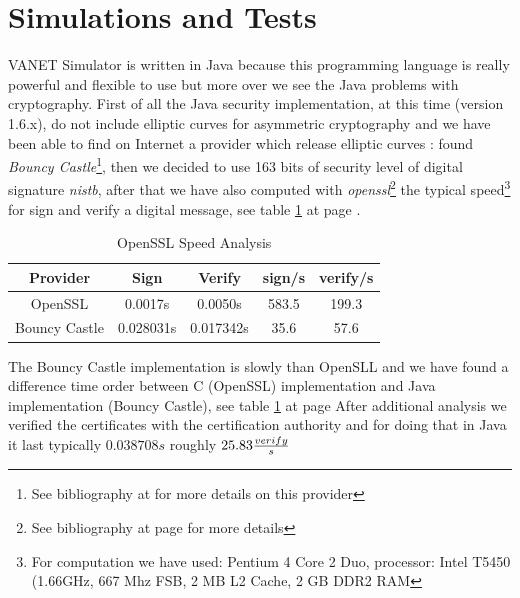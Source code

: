 \section{Simulations and Tests}
VANET Simulator is written in Java because this programming language is really powerful and flexible to use but more over we see the Java problems with cryptography. First of all the Java security implementation, at this time (version 1.6.x), do not include elliptic curves for asymmetric cryptography and we have been able to find  on Internet a provider which release elliptic curves : found \textit{Bouncy Castle}\footnote{See bibliography at \pageref{bibliography} for more details on this provider}, then we decided to  use 163 bits  of security level of digital signature \textit{nistb}, after that we have also computed with \emph{openssl}\footnote{See bibliography at page \pageref{bibliography} for more details} the typical speed\footnote{For computation we have used: Pentium 4 Core 2 Duo, processor: Intel T5450 (1.66GHz, 667 Mhz FSB, 2 MB L2 Cache, 2 GB DDR2 RAM} for sign and verify a digital message, see table \ref{tab:OpensslVelocity} at page \pageref{tab:OpensslVelocity}.
\begin{table}[!ht]
	\centering
	\caption{OpenSSL Speed Analysis}
	\begin{tabular}{|c|c|c|c|c|}
	\hline\hline 
	\textbf{Provider} & \textbf{Sign} & \textbf{Verify} & \textbf{sign/s} & \textbf{verify/s} \\
	\hline
	OpenSSL & 0.0017s & 0.0050s & 583.5 & 199.3 \\
	\hline
	Bouncy Castle & 0.028031s & 0.017342s & 35.6 & 57.6 \\
	\hline
	\hline     %
 	\end{tabular} 
	\label{tab:OpensslVelocity}
\end{table}
The Bouncy Castle implementation is slowly than OpenSLL and we have found a difference time order  between C (OpenSSL)  implementation and Java implementation (Bouncy Castle), see table \ref{tab:OpensslVelocity} at page 
After additional analysis we verified the certificates with the certification authority and for doing that in Java it last typically $0.038708s$ roughly $25.83 {verify \over s}$
